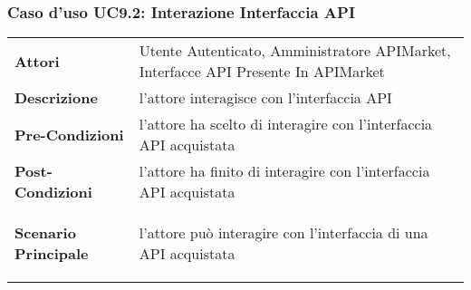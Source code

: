 \subsubsection{Caso d'uso UC9.2: Interazione Interfaccia API}
\label{UC9.2}

\renewcommand*{\arraystretch}{1.6}
\begin{longtable}{ l | p{11cm}}
	\hline
	\rowcolor{Gray}
	\multicolumn{2}{c}{UC9.2: Interazione Interfaccia API} \\
	\hline
	\textbf{Attori} &Utente Autenticato, Amministratore APIMarket, Interfacce API Presente In APIMarket \\
	\textbf{Descrizione} & l'attore interagisce con l'interfaccia API \\
	\textbf{Pre-Condizioni} & l'attore ha scelto di interagire con l'interfaccia API acquistata\\
	\textbf{Post-Condizioni}& l'attore ha finito di interagire con l'interfaccia API acquistata\\
	\textbf{Scenario Principale} & \begin{enumerate*}[label=(\arabic*.),itemjoin={\newline}]
			\item l'attore può interagire con l'interfaccia di una API acquistata
	\end{enumerate*}\\
\end{longtable}